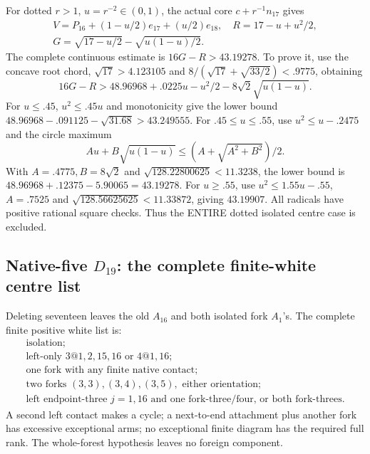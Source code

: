 \documentclass[11pt]{article}
\theoremstyle{definition}
\theoremstyle{remark}
\begin{document}
For dotted \(r>1\),
\(u=r^{-2}\in(0,1)\), the actual
core \(c+r^{-1}n_{17}\) gives
\[
\begin{gathered}
 V=P_{16}+(1-u/2)e_{17}+(u/2)e_{18},\quad
 R=17-u+u^2/2,\\
 G=\sqrt{17-u/2}-\sqrt{u(1-u)/2}.
\end{gathered}
\]
The complete continuous estimate
is \(16G-R>43.19278\).
To prove it, use the concave
root chord, \(\sqrt{17}>4.123105\)
and
\(8/(\sqrt{17}+\sqrt{33/2})<.9775\),
obtaining
\[
 16G-R>48.96968+.0225u-u^2/2
                                  -8\sqrt2\sqrt{u(1-u)} .
\]
For \(u\le.45\), \(u^2\le.45u\)
and monotonicity give the lower
bound
\(48.96968-.091125-\sqrt{31.68}
>43.249555\).
For \(.45\le u\le.55\),
use \(u^2\le u-.2475\) and
the circle maximum
\[
 Au+B\sqrt{u(1-u)}
                         \le(A+\sqrt{A^2+B^2})/2 .
\]
With \(A=.4775,B=8\sqrt2\) and
\(\sqrt{128.22800625}<11.3238\),
the lower bound is
\(48.96968+.12375-5.90065=43.19278\).
For \(u\ge.55\), use
\(u^2\le1.55u-.55\),
\(A=.7525\) and
\(\sqrt{128.56625625}<11.33872\),
giving \(43.19907\).
All radicals have positive
rational square checks.
Thus the ENTIRE dotted isolated
centre case is excluded.

\subsection{Native-five \(D_{19}\): the complete finite-white centre list}
\label{app:exact19:Dfivecentrelist}

Deleting seventeen leaves the
old \(A_{16}\) and both isolated
fork \(A_1\)'s.
The complete finite positive
white list is:
\[
\begin{array}{l}
 \text{isolation};\\
 \text{left-only }3@1,2,15,16\text{ or }4@1,16;\\
 \text{one fork with any finite native contact};\\
 \text{two forks }(3,3),(3,4),(3,5),\text{ either orientation};\\
 \text{left endpoint-three }j=1,16\text{ and one fork-three/four,
 or both fork-threes}.
\end{array}
\]
A second left contact makes a
cycle; a next-to-end attachment
plus another fork has excessive
exceptional arms; no exceptional
finite diagram has the required
full rank.
The whole-forest hypothesis
leaves no foreign component.
\end{document}
